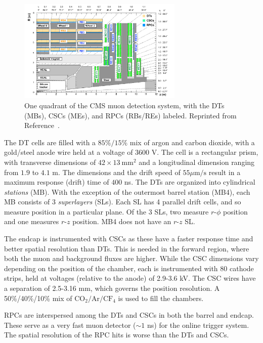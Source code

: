\begin{figure}[]
	\begin{center}
		\includegraphics[width=0.7\textwidth]{figures/cms/muon.png}
		\caption{One quadrant of the CMS muon detection system, with the DTs (MBs), CSCs (MEs), and RPCs (RBs/REs) labeled. 
				 Reprinted from Reference~\cite{cmsmuon}.}
		\label{fig:cms:muondet}
	\end{center}
\end{figure}

The DT cells are filled with a $85\%/15\%$ mix of argon and carbon dioxide, with a gold/steel anode wire held at a voltage of $3600$ V.
The cell is a rectangular prism, with transverse dimensions of $42\times13~\mathrm{mm}^2$ and a longitudinal dimension ranging from $1.9$ to $4.1$ m.
The dimensions and the drift speed of $55\mu\mathrm{m/s}$ result in a maximum response (drift) time of $400$ ns.
The DTs are organized into cylindrical \emph{stations} (MB).
With the exception of the outermost barrel station (MB4), each MB consists of 3 \emph{superlayers} (SLs).
Each SL has 4 parallel drift cells, and so measure position in a particular plane.
Of the 3 SLs, two measure $r$-$\phi$ position and one measures $r$-$z$ position. 
MB4 does not have an $r$-$z$ SL.

The endcap is instrumented with CSCs as these have a faster response time and better spatial resolution than DTs.
This is needed in the forward region, where both the muon and background fluxes are higher.
While the CSC dimensions vary depending on the position of the chamber, each is instrumented with 80 cathode strips, held at voltages (relative to the anode) of 2.9-3.6 kV.
The CSC wires have a separation of 2.5-3.16 mm, which governs the position resolution.
A 50\%/40\%/10\% mix of $\mathrm{CO}_2/\mathrm{Ar}/\mathrm{CF}_4$ is used to fill the chambers.

RPCs are interspersed among the DTs and CSCs in both the barrel and endcap. 
These serve as a very fast muon detector ($\sim 1$ ns) for the online trigger system. 
The spatial resolution of the RPC hits is worse than the DTs and CSCs.

